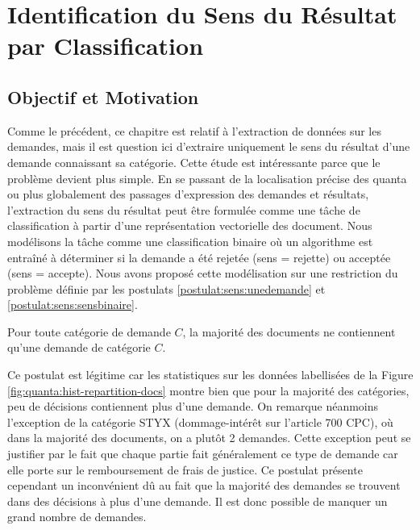 \chapter{Identification du Sens du Résultat par Classification}
\label{chap:sensresultat}

\section{Objectif et Motivation}
\label{sec:sensresultat:motivation}
Comme le précédent, ce chapitre est relatif à l'extraction de données sur les demandes, mais  il est question ici d'extraire uniquement le sens du résultat d'une demande connaissant sa catégorie. Cette étude est intéressante parce que le problème devient plus simple. En se passant de la localisation précise des quanta ou plus globalement des passages d'expression des demandes et résultats, l'extraction du sens du résultat peut être formulée comme une tâche de classification à partir d'une représentation vectorielle des document. Nous modélisons la tâche comme une classification binaire où un algorithme est entraîné à déterminer si la demande a été rejetée (sens = rejette) ou acceptée (sens = accepte). Nous avons proposé cette modélisation sur une restriction du problème définie par les postulats \ref{postulat:sens:unedemande} et \ref{postulat:sens:sensbinaire}.

\begin{postulat}\label{postulat:sens:unedemande}
Pour toute catégorie de demande $C$, la majorité des documents ne contiennent qu'une demande de catégorie $C$.
\end{postulat} 
Ce postulat est légitime car les statistiques sur les données labellisées de la Figure \ref{fig:quanta:hist-repartition-docs} montre bien que pour la majorité des catégories, peu de décisions contiennent plus d'une demande. On remarque néanmoins l'exception de la catégorie STYX (dommage-intérêt sur l'article 700 CPC), où dans la majorité des documents, on a plutôt 2 demandes. Cette exception peut se justifier par le fait que chaque partie fait généralement ce type de demande car elle porte sur le remboursement de frais de justice. Ce postulat présente cependant un inconvénient dû au fait que la majorité des demandes se trouvent dans des décisions à plus d'une demande. Il est donc possible de manquer un grand nombre de demandes. %

